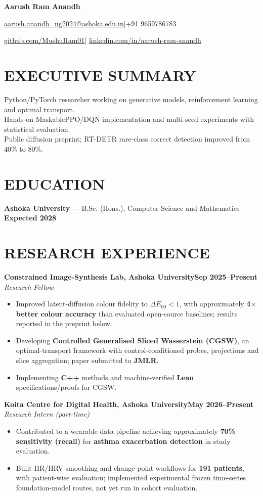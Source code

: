 \documentclass[10pt,a4paper]{article}
\newcommand{\entry}[3]{\noindent\textbf{#1}\hfill\textbf{#3}\\[-1pt]\textit{#2}\par}
\newenvironment{cvitems}{\begin{itemize}[leftmargin=1.1em,label=\textbullet,itemsep=2pt,topsep=3pt,parsep=0pt,partopsep=0pt]}{\end{itemize}}
\begin{document}
{\LARGE\bfseries Aarush Ram Anandh}\par\vspace{4pt}
\href{mailto:aarush.anandh_ug2024@ashoka.edu.in}{aarush.anandh\_ug2024@ashoka.edu.in}\quad|\quad +91 9659786783\par\vspace{2pt}
\href{https://github.com/MushuRam01}{github.com/MushuRam01}\quad|\quad
\href{https://www.linkedin.com/in/aarush-ram-anandh/}{linkedin.com/in/aarush-ram-anandh}\par

\section{EXECUTIVE SUMMARY}
Python/PyTorch researcher working on generative models, reinforcement learning and optimal transport.\\
Hands-on MaskablePPO/DQN implementation and multi-seed experiments with statistical evaluation.\\
Public diffusion preprint; RT-DETR rare-class correct detection improved from 40\% to 80\%.\par
\section{EDUCATION}
\textbf{Ashoka University} --- B.Sc. (Hons.), Computer Science and Mathematics \hfill \textbf{Expected 2028}
\section{RESEARCH EXPERIENCE}
\entry{Constrained Image-Synthesis Lab, Ashoka University}{Research Fellow}{Sep 2025--Present}
\begin{cvitems}
  \item Improved latent-diffusion colour fidelity to $\Delta E_{00}<1$, with approximately \textbf{4$\times$ better colour accuracy} than evaluated open-source baselines; results reported in the preprint below.
  \item Developing \textbf{Controlled Generalised Sliced Wasserstein (CGSW)}, an optimal-transport framework with control-conditioned probes, projections and slice aggregation; paper submitted to \textbf{JMLR}.
  \item Implementing \textbf{C++} methods and machine-verified \textbf{Lean} specifications/proofs for CGSW.
\end{cvitems}
\entry{Koita Centre for Digital Health, Ashoka University}{Research Intern (part-time)}{May 2026--Present}
\begin{cvitems}
  \item Contributed to a wearable-data pipeline achieving approximately \textbf{70\% sensitivity (recall)} for \textbf{asthma exacerbation detection} in study evaluation.
  \item Built HR/HRV smoothing and change-point workflows for \textbf{191 patients}, with patient-wise evaluation; implemented experimental frozen time-series foundation-model routes, not yet run in cohort evaluation.
\end{cvitems}
\end{document}

